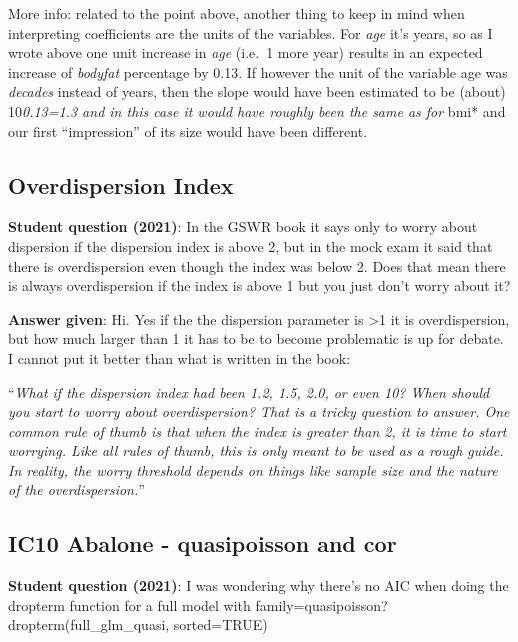 \documentclass[
  letterpaper,
  8pt,
  a4paper]{book}
\begin{document}
More info: related to the point above, another thing to keep in mind
when interpreting coefficients are the units of the variables. For
\emph{age} it's years, so as I wrote above one unit increase in
\emph{age} (i.e.~1 more year) results in an expected increase of
\emph{bodyfat} percentage by 0.13. If however the unit of the variable
age was \emph{decades} instead of years, then the slope would have been
estimated to be (about) 10\emph{0.13=1.3 and in this case it would have
roughly been the same as for }bmi* and our first ``impression'' of its
size would have been different.

\subsection*{Overdispersion Index}\label{overdispersion-index}

\textbf{Student question (2021)}: In the GSWR book it says only to worry
about dispersion if the dispersion index is above 2, but in the mock
exam it said that there is overdispersion even though the index was
below 2. Does that mean there is always overdispersion if the index is
above 1 but you just don't worry about it?

\textbf{Answer given}: Hi. Yes if the the dispersion parameter is
\textgreater1 it is overdispersion, but how much larger than 1 it has to
be to become problematic is up for debate. I cannot put it better than
what is written in the book:

``\emph{What if the dispersion index had been 1.2, 1.5, 2.0, or even 10?
When should you start to worry about overdispersion? That is a tricky
question to answer. One common rule of thumb is that when the index is
greater than 2, it is time to start worrying. Like all rules of thumb,
this is only meant to be used as a rough guide. In reality, the worry
threshold depends on things like sample size and the nature of the
overdispersion.}''

\subsection*{IC10 Abalone - quasipoisson and
cor}\label{ic10-abalone---quasipoisson-and-cor}

\textbf{Student question (2021)}: I was wondering why there's no AIC
when doing the dropterm function for a full model with
family=quasipoisson? dropterm(full\_glm\_quasi, sorted=TRUE)
\end{document}
